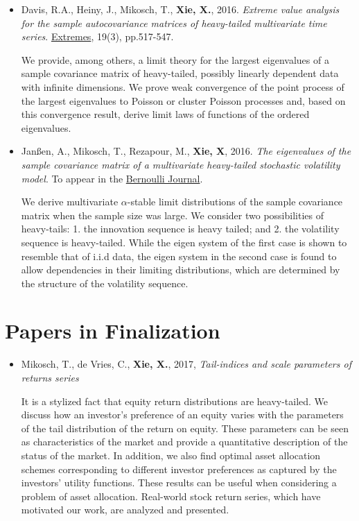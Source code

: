 \documentclass[a4paper]{twentysecondcv} %
\begin{document}
\begin{itemize}
\item Davis, R.A., Heiny, J., Mikosch, T., {\bf Xie, X.},
  2016. {\it Extreme value analysis for the sample autocovariance
    matrices of heavy-tailed multivariate time series}.
  \underline{Extremes}, 19(3), pp.517-547.
  
  {\small
  We provide, among others, a limit theory for the largest eigenvalues
  of a sample covariance matrix of heavy-tailed, possibly linearly
  dependent data with infinite dimensions. We prove weak convergence of
  the point process of the largest eigenvalues to Poisson or cluster
  Poisson processes and, based on this convergence result, derive limit
  laws of functions of the ordered eigenvalues.}

\item Jan\ss en, A., Mikosch, T., Rezapour, M., {\bf Xie, X},
  2016. {\it The eigenvalues of the sample covariance matrix of a
    multivariate heavy-tailed stochastic volatility model}.
  To appear in the \underline{Bernoulli Journal}.
  
  {\small
  We derive multivariate $\alpha$-stable limit distributions of the
  sample covariance matrix when the sample size was large. We
  consider two possibilities of heavy-tails: 1. the innovation
  sequence is heavy tailed; and 2. the volatility sequence is
  heavy-tailed. While the eigen system of the first case is shown to
  resemble that of i.i.d data, the eigen system in the second case is
  found to allow dependencies in their limiting distributions, which
  are determined by the structure of the volatility sequence.}
\end{itemize}

\section{Papers in Finalization}
\begin{itemize}
\item Mikosch, T., de Vries, C., {\bf Xie, X.}, 2017,
  {\it Tail-indices and scale parameters of returns series}

  {\small
    It is a stylized fact that equity return distributions are
    heavy-tailed. We discuss how an investor's preference of an equity
    varies with the parameters of the tail distribution of the return on
    equity. These parameters can be seen as characteristics of the
    market and provide a quantitative description of the status of the
    market.
    In addition, we also find optimal asset allocation schemes
    corresponding to different investor preferences as captured by the
    investors' utility functions. These results can be useful when
    considering a problem of asset allocation. Real-world stock return
    series, which have motivated our work, are analyzed and presented.
  }
\end{itemize}
\end{document}
